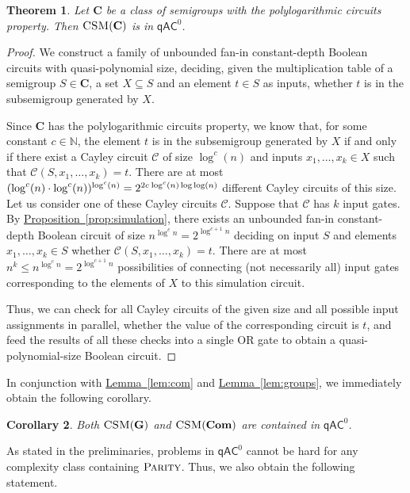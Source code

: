 \documentclass[11pt]{article}
\numberwithin{equation}{section}
\newtheorem{theorem}{Theorem}[section]
\newtheorem{corollary}[theorem]{Corollary}
\theoremstyle{definition}
\theoremstyle{plain}
\newcommand{\C}{\mathbb C}
\newcommand{\N}{\mathbb N}
\newcommand{\expref}[2]{\hyperref[#2]{#1~\ref{#2}}}
\renewcommand{\leq}{\leqslant}
\renewcommand{\le}{\leq}
\newcommand{\qAC}{\ensuremath{\mathsf{qAC}}}
\newcommand{\vC}{\mathbf{C}}
\newcommand{\vCom}{\mathbf{Com}}
\newcommand{\vG}{\mathbf{G}}
\newcommand{\CSM}{\ensuremath{\textsc{CSM}}}
\newcommand{\Parity}{\ensuremath{\textsc{Parity}}}
\renewcommand{\C}{\ensuremath{\mathcal{C}}}
\newcommand{\SPLCP}{polylogarithmic circuits property}
\newcommand{\ms}{\hspace*{0.5pt}}
\begin{document}
\begin{theorem}
  Let $\vC$ be a class of semigroups with the {\SPLCP}.
  Then $\CSM(\vC)$ is in $\qAC^0$.
  \label{thm:qACzero}
\end{theorem}
%
\begin{proof}
  We construct a family of unbounded fan-in constant-depth Boolean circuits
  with quasi-polynomial size, deciding, given the multiplication table of a
  semigroup $S \in \vC$, a set $X \subseteq S$ and an element $t \in S$ as
  inputs, whether $t$ is in the subsemigroup generated by $X$.

  Since $\vC$ has the {\SPLCP}, we know that, for some constant $c \in \N$, the
  element $t$ is in the subsemigroup generated by $X$ if and only if there
  exist a Cayley circuit $\C$ of size $\log^c(n)$ and inputs $x_1, \dots, x_k
  \in X$ such that $\C(S, x_1, \dots, x_k) = t$.
  There are at most $(\log^{c}(n) \cdot \log^{c}(n))^{\log^c(n)} = 2^{2c \ms
  \log^c(n) \log \log(n)}$ different Cayley circuits of this size.
  Let us consider one of these Cayley circuits $\C$. Suppose that $\C$ has $k$
  input gates.
  By \expref{Proposition}{prop:simulation}, there exists an unbounded fan-in
  constant-depth Boolean circuit of size $n^{\log^c n} = 2^{\log^{c+1} n}$
  deciding on input $S$ and elements $x_1, \dots, x_k \in S$ whether $\C(S,
  x_1, \dots, x_k) = t$.
  There are at most $n^k \le n^{\log^c n} = 2^{\log^{c+1} n}$ possibilities of
  connecting (not necessarily all) input gates corresponding to the elements of
  $X$ to this simulation circuit.

  Thus, we can check for all Cayley circuits of the given size and all possible
  input assignments in parallel, whether the value of the corresponding circuit
  is $t$, and feed the results of all these checks into a single OR gate to
  obtain a quasi-polynomial-size Boolean circuit.
\end{proof}

In conjunction with \expref{Lemma}{lem:com} and \expref{Lemma}{lem:groups}, we
immediately obtain the following corollary.

\begin{corollary}
  Both $\CSM(\vG)$ and $\CSM(\vCom)$ are contained in $\qAC^0$.
  \label{crl:qACzero}
\end{corollary}

As stated in the preliminaries, problems in $\qAC^0$ cannot be hard for any
complexity class containing $\Parity$. Thus, we also obtain the following
statement.
\end{document}

